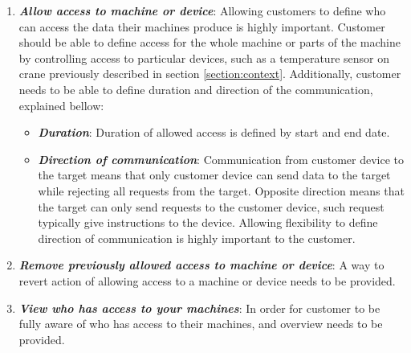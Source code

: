 \begin{enumerate}
	\setlength{\itemsep}{1pt}
	\item \textbf{\textit{Allow access to machine or device}}: Allowing customers to define who can access the data their machines produce is highly important. Customer should be able to define access for the whole machine or parts of the machine by controlling access to particular devices, such as a temperature sensor on crane previously described in section \ref{section:context}. Additionally, customer needs to be able to define duration and direction of the communication, explained bellow:
		\begin{itemize}
			\item \textbf{\textit{Duration}}: Duration of allowed access is defined by start and end date.
			\item \textbf{\textit{Direction of communication}}: Communication from customer device to the target means that only customer device can send data to the target while rejecting all requests from the target. Opposite direction means that the target can only send requests to the customer device, such request typically give instructions to the device. Allowing flexibility to define direction of communication is highly important to the customer.
		\end{itemize}

	\item \textbf{\textit{Remove previously allowed access to machine or device}}: A way to revert action of allowing access to a machine or device needs to be provided. 
		
	\item \textbf{\textit{View who has access to your machines}}: In order for customer to be fully aware of who has access to their machines, and overview needs to be provided.

\end{enumerate}

